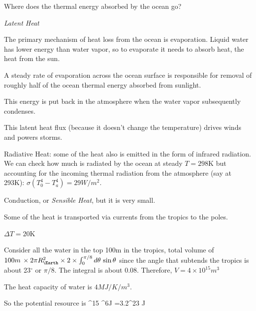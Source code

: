 \documentclass[11pt]{book}
\begin{document}
Where does the thermal energy absorbed by the ocean go? 
\bei
\item {\it Latent Heat} 
\bee
\item The primary mechanism of heat loss from the ocean is evaporation. Liquid water has lower energy than water vapor, so to evaporate it needs to absorb heat, the heat from the sun. 
\item A steady rate of evaporation across the ocean surface is responsible for removal of roughly half of the ocean thermal energy absorbed from sunlight. 
\item This energy is put back in the atmosphere when the water vapor subsequently condenses. 
\item This latent heat flux (because it doesn't change the temperature) drives winds and powers storms.
\eee
\item Radiative Heat: some of the heat also is emitted in the form of infrared radiation. We can check how much is radiated by the ocean at steady $T=298$K but accounting for the incoming thermal radiation from the atmosphere (say at 293K): $\sigma (T_0^4-T_a^4)= 29W/m^2$.
\item Conduction, or {\it Sensible Heat}, but it is very small.
\item Some of the heat is transported via currents from the tropics to the poles.
\eei


\bei
\item $\Delta T=20$K
\item Consider all the water in the top 100m in the tropics, total volume of $100m\,\times 2\pi R_\Earth^2  \times 2\times\int_0^{\pi/8} d\theta\,\sin\theta$ since the angle that subtends the tropics is about 23$^\circ$ or $\pi/8$. The integral is about 0.08. Therefore, $V=4\times 10^{15}m^3$
\item The heat capacity of water is $4 MJ/K/m^3$.
\item So the potential resource is 
^{15} ^6J =3.2^{23} J\ee
\eei



\end{document}
